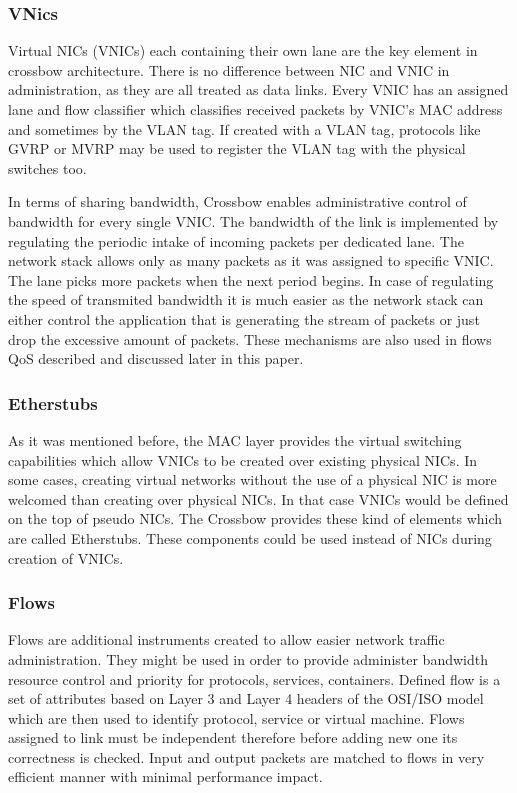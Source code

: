 \documentclass[11pt]{book}
\begin{document}
      \subsubsection{VNics}
      
        Virtual NICs (VNICs) each containing their own lane are the key element in crossbow architecture. There is no
        difference between NIC and VNIC in administration, as they are all treated as data links. Every VNIC has an
        assigned lane and flow classifier which classifies received packets by VNIC's MAC address and sometimes by the
        VLAN tag.  If created with a VLAN tag, protocols like GVRP or MVRP may be used to register the VLAN tag with the
        physical switches too.	

        In terms of sharing bandwidth, Crossbow enables administrative control of bandwidth for every single VNIC. The
        bandwidth of the link is implemented by regulating the periodic intake of incoming packets per dedicated lane. The
        network stack allows only as many packets as it was assigned to specific VNIC. The lane picks more packets when
        the next period begins. In case of regulating the speed of transmited bandwidth it is much easier as the network
        stack can either control the application that is generating the stream of packets or just drop the excessive
        amount of packets.  These mechanisms are also used in flows QoS described and discussed later in this paper.


      \subsubsection{Etherstubs}

        As it was mentioned before, the MAC layer provides the virtual switching capabilities which allow VNICs to be
        created over existing physical NICs.  In some cases, creating virtual networks without the use of a physical NIC
        is more welcomed than creating over physical NICs. In that case VNICs would be defined on the top of pseudo NICs.
        The Crossbow provides these kind of elements which are called Etherstubs. These components could be used instead
        of NICs during creation of VNICs.


      \subsubsection{Flows}

                       Flows are additional instruments created to allow easier network traffic administration. They might be used in order to provide administer bandwidth resource control and priority for protocols, services, containers.
                        Defined flow is a set of attributes based on Layer 3 and Layer 4 headers of the OSI/ISO model which are then used to identify protocol, service or virtual machine. 
                        Flows assigned to link must be independent therefore before adding new one its correctness is checked. Input and output packets are matched to flows in very efficient 
                        manner with minimal performance impact.
\end{document}
